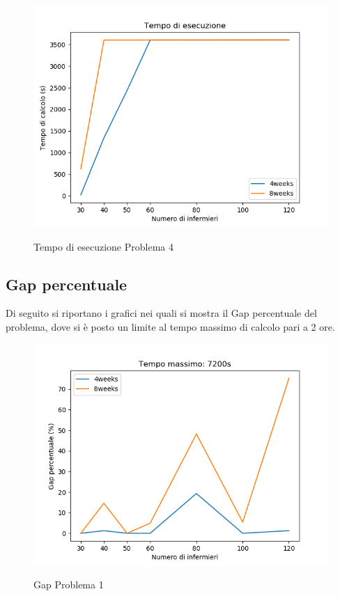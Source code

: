 \begin{figure}[H]
\begin{center}
  \includegraphics[scale=0.5]{img/Problema4/Time_1h-h1_w4.png}\\
  \caption{Tempo di esecuzione Problema 4}
\end{center}
\end{figure}


\subsection{Gap percentuale}
Di seguito si riportano i grafici nei quali si mostra il Gap percentuale del problema, dove si è posto un limite al tempo massimo di calcolo pari a 2 ore.
\begin{figure}[H]
\begin{center}
  \includegraphics[scale=0.5]{img/Problema1/Gap_2h-h0_w0.png}\\
  \caption{Gap Problema 1}
\end{center}
\end{figure}

